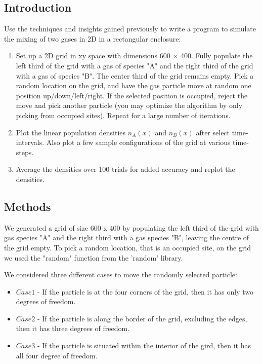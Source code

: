 \documentclass[11pt, oneside]{article}   	%
\begin{document}
\subsection{Introduction}
Use the techniques and insights gained previously to write a program to simulate the mixing of two gases in 2D in a rectangular enclosure:

\begin{enumerate}[label=(\alph*)]

\item Set up a 2D grid in xy space with dimensions 600 $\times$ 400. Fully populate the left third of the grid with a gas of species "A" and the right third of the grid with a gas of species "B". The center third of the grid remains empty. Pick a random location on the grid, and have the gas particle move at random one position up/down/left/right. If the selected position is occupied, reject the move and pick another particle (you may optimize the algorithm by only picking from occupied sites). Repeat for a large number of iterations. 

\item Plot the linear population densities $n_A (x)$ and $n_B (x)$ after select time-intervals. Also plot a few sample configurations of the grid at various time-steps.

\item Average the densities over 100 trials for added accuracy and replot the densities.

\end{enumerate}

\subsection{Methods}
We generated a grid of size 600 x 400 by populating the left third of the grid with gas species "A" and the right third with a gas species "B", leaving the centre of the grid empty. To pick a random location, that is an occupied site, on the grid we used the "random" function from the 'random' library. 

We considered three different cases to move the randomly selected particle:

\begin{itemize}

\item $Case 1$ - If the particle is at the four corners of the grid, then it has only two degrees of freedom.

\item $Case 2$ - If the particle is along the border of the grid, excluding the edges, then it has three degrees of freedom.

\item $Case 3$ - If the particle is situated within the interior of the gird, then it has all four degree of freedom. 

\end{itemize}
\end{document}
